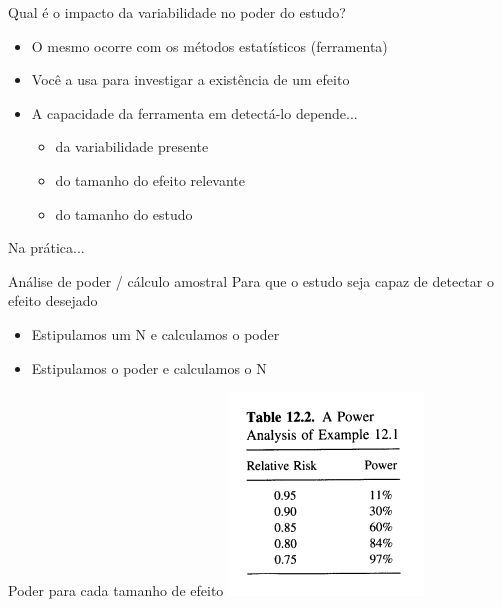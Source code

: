 \documentclass{beamer}
\begin{document}
\begin{frame}
  \begin{center}
    Qual é o impacto da variabilidade no poder do estudo?
  \end{center}
\end{frame}

\begin{frame}{\scriptsize }
  \begin{itemize}
    \footnotesize
  \item O mesmo ocorre com os métodos estatísticos (ferramenta)
    \bigskip
  \item<2-> Você a usa para investigar a existência de um efeito
    \bigskip
  \item<3-> A capacidade da ferramenta em detectá-lo depende...
    \begin{itemize}
      \scriptsize
    \item<3-> da variabilidade presente 
      \smallskip
    \item<3-> do tamanho do efeito relevante 
      \smallskip
    \item<3-> do tamanho do estudo 
    \end{itemize}
  \end{itemize}
\end{frame}

\begin{frame}{\scriptsize Na prática...}
    \begin{block}{\scriptsize Análise de poder / cálculo amostral}
    \scriptsize
    Para que o estudo seja capaz de detectar o efeito desejado
    \medskip
    \begin{itemize}
      \scriptsize
    \item Estipulamos um N e calculamos o poder %
    \item Estipulamos o poder e calculamos o N %
    \end{itemize}
  \end{block}
  \bigskip
  \bigskip
  \begin{exampleblock}{\scriptsize Poder para cada tamanho de efeito}
    \centering
    \includegraphics[height=.4\textheight]{Cap10-11/tab12_2-power_by_effect}
  \end{exampleblock}
\end{frame}
\end{document}
